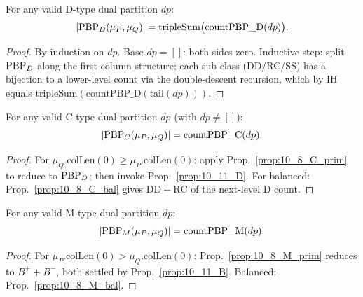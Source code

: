 \begin{proposition}
  \label{prop:10_11_D}
  \leanok
  For any valid D-type dual partition $dp$:
  \[ |\mathrm{PBP}_D(\mu_P, \mu_Q)| = \mathrm{tripleSum}\big(\mathrm{countPBP\_D}(dp)\big). \]
\end{proposition}
\begin{proof}
  \leanok
  By induction on $dp$. Base $dp = []$: both sides zero. Inductive step: split $\mathrm{PBP}_D$ along the first-column structure; each sub-class (DD/RC/SS) has a bijection to a lower-level count via the double-descent recursion, which by IH equals $\mathrm{tripleSum}(\mathrm{countPBP\_D}(\mathrm{tail}(dp)))$.
\end{proof}


\begin{proposition}
  \label{prop:10_12_C}
  \leanok
  For any valid C-type dual partition $dp$ (with $dp \neq []$):
  \[ |\mathrm{PBP}_C(\mu_P, \mu_Q)| = \mathrm{countPBP\_C}(dp). \]
\end{proposition}
\begin{proof}
  \leanok
  For $\mu_Q.\mathrm{colLen}(0) \geq \mu_P.\mathrm{colLen}(0)$: apply Prop.~\ref{prop:10_8_C_prim} to reduce to $\mathrm{PBP}_D$; then invoke Prop.~\ref{prop:10_11_D}. For balanced: Prop.~\ref{prop:10_8_C_bal} gives $\mathrm{DD} + \mathrm{RC}$ of the next-level D count.
\end{proof}


\begin{proposition}
  \label{prop:10_12_M}
  \leanok
  For any valid M-type dual partition $dp$:
  \[ |\mathrm{PBP}_M(\mu_P, \mu_Q)| = \mathrm{countPBP\_M}(dp). \]
\end{proposition}
\begin{proof}
  \leanok
  For $\mu_P.\mathrm{colLen}(0) > \mu_Q.\mathrm{colLen}(0)$: Prop.~\ref{prop:10_8_M_prim} reduces to $B^+ + B^-$, both settled by Prop.~\ref{prop:10_11_B}. Balanced: Prop.~\ref{prop:10_8_M_bal}.
\end{proof}


